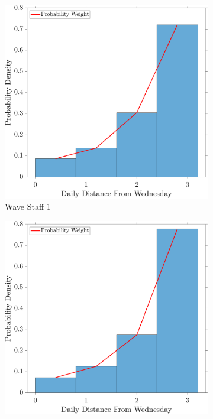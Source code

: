 \documentclass[
10pt, %
letterpaper, %
twoside, %
headinclude,footinclude, %
BCOR5mm, %
]{scrartcl}
\begin{document}
\begin{figure}[h!]
	\centering
	\begin{subfigure}[t]{0.49\linewidth}
		\centering
		\includegraphics[width=\linewidth]{figures/PDF_LOG1.pdf}
		\caption{Wave Staff 1} 
		\label{fig:PDFL1}
	\end{subfigure}
	\begin{subfigure}[t]{0.49\linewidth}
		\centering
		\includegraphics[width=\linewidth]{figures/PDF_LOG2.pdf}

\end{subfigure}
\end{figure}
\end{document}
